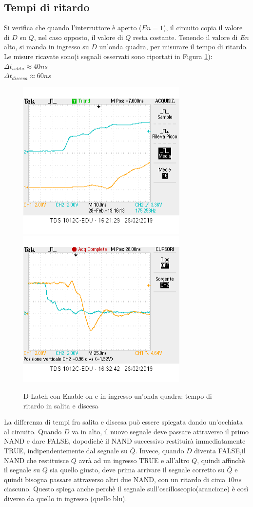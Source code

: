 \documentclass[10pt,a4paper]{article}
\begin{document}
\subsection{Tempi di ritardo}
Si verifica che quando l'interruttore è aperto ($En=1$), il circuito copia il valore di $D$ su $Q$, nel caso opposto, il valore di $Q$ resta costante. Tenendo il valore di $En$ alto, si manda in ingresso su $D$ un'onda quadra, per misurare il tempo di ritardo. \\Le misure ricavate sono(i segnali osservati sono riportati in Figura \ref{dlatch}):\\ $\Delta t_{salita}\approx40 ns$
\\$\Delta t_{discesa}\approx60 ns$\\
\begin{figure}[h]

	\includegraphics[scale=0.7]{ritardo2.png}
	\includegraphics[scale=0.7]{ritardodiscesa2.png}
	\caption{D-Latch con Enable on e in ingresso un'onda quadra: tempo di ritardo in salita e discesa}
		\label{dlatch}
\end{figure} 
La differenza di tempi fra salita e discesa può essere spiegata dando un'occhiata al circuito. Quando $D$ va in alto, il nuovo segnale deve passare attraverso il primo NAND e dare FALSE, dopodichè il NAND successivo restituirà immediatamente TRUE, indipendentemente dal segnale su $\bar{Q}$. Invece, quando $D$ diventa FALSE,il NAND che restituisce $Q$ avrà ad un ingresso TRUE e all'altro $\bar{Q}$, quindi affinchè il segnale su $Q$ sia quello giusto, deve prima arrivare il segnale corretto su $\bar{Q}$ e quindi bisogna passare attraverso altri due NAND, con un ritardo di circa $10 ns$ ciascuno. Questo spiega anche perchè il segnale sull'oscilloscopio(arancione) è così diverso da quello in ingresso (quello blu).
\end{document}
